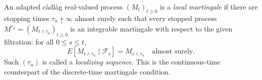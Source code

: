 
An adapted càdlàg real-valued process $(M_t)_{t\ge0}$ is a \emph{local martingale} if there are stopping times $\tau_n\uparrow\infty$ almost surely such that every stopped process $M^{\tau_n}=(M_{t\wedge\tau_n})_{t\ge0}$ is an integrable martingale with respect to the given filtration: for all $0\le s\le t$,
\[
E[M_{t\wedge\tau_n}\mid\mathcal F_s]=M_{s\wedge\tau_n}\quad\text{almost surely}.
\]
Such $(\tau_n)$ is called a \emph{localizing sequence}. This is the continuous-time counterpart of the discrete-time martingale condition.
